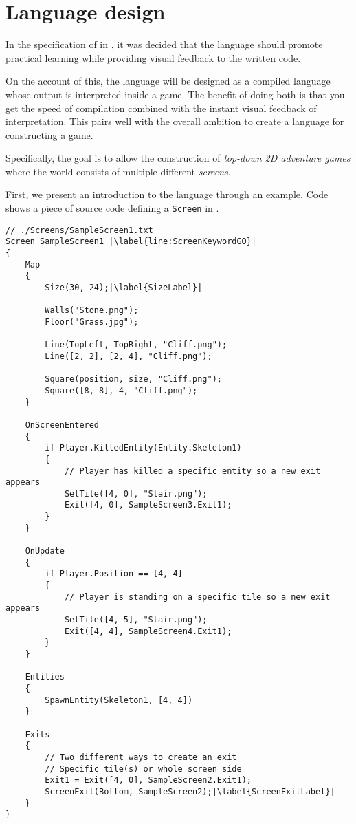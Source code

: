 \chapter{Language design}\label{chap:language_design}
In the specification of \dazel{} in , it was decided that the language should promote practical learning while providing visual feedback to the written code. 

On the account of this, the \dazel{} language will be designed as a compiled language whose output is interpreted inside a game.
The benefit of doing both is that you get the speed of compilation combined with the instant visual feedback of interpretation.
This pairs well with the overall ambition to create a language for constructing a game.

Specifically, the goal is to allow the construction of \textit{top-down 2D adventure games} where the world consists of multiple different \textit{screens}.

First, we present an introduction to the \dazel{} language through an example. Code  shows a piece of source code defining a \texttt{Screen} in \dazel{}. 

\begin{lstlisting}[language=CSharp, caption={Example screen.}, label={lst:SampleScreen1},escapechar=|]
// ./Screens/SampleScreen1.txt
Screen SampleScreen1 |\label{line:ScreenKeywordGO}|
{
    Map 
    {
        Size(30, 24);|\label{SizeLabel}|

        Walls("Stone.png"); 
        Floor("Grass.jpg");

        Line(TopLeft, TopRight, "Cliff.png");
        Line([2, 2], [2, 4], "Cliff.png");

        Square(position, size, "Cliff.png");
        Square([8, 8], 4, "Cliff.png");
    }

    OnScreenEntered
    {
        if Player.KilledEntity(Entity.Skeleton1) 
        {
            // Player has killed a specific entity so a new exit appears
            SetTile([4, 0], "Stair.png");
            Exit([4, 0], SampleScreen3.Exit1);
        }
    }

    OnUpdate
    {
        if Player.Position == [4, 4] 
        {
            // Player is standing on a specific tile so a new exit appears
            SetTile([4, 5], "Stair.png");
            Exit([4, 4], SampleScreen4.Exit1);
        }
    }

    Entities
    {
        SpawnEntity(Skeleton1, [4, 4])
    }
    
    Exits 
    {
        // Two different ways to create an exit
        // Specific tile(s) or whole screen side
        Exit1 = Exit([4, 0], SampleScreen2.Exit1);
        ScreenExit(Bottom, SampleScreen2);|\label{ScreenExitLabel}|
    }
}
\end{lstlisting}

